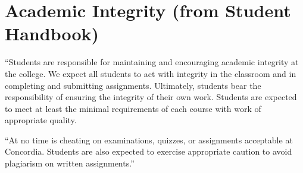 \documentclass{tufte-handout}
\begin{document}
\section{Academic Integrity (from Student Handbook)}



``Students are responsible for maintaining and encouraging academic integrity at the college. We expect all students to act with integrity in the classroom and in completing and submitting assignments. Ultimately, students bear the responsibility of ensuring the integrity of their own work. Students are expected to meet at least the minimal requirements of each course with work of appropriate quality. 


``At no time is cheating on examinations, quizzes, or assignments acceptable at Concordia. Students are also expected to exercise appropriate caution to avoid plagiarism on written assignments.''
\end{document}
